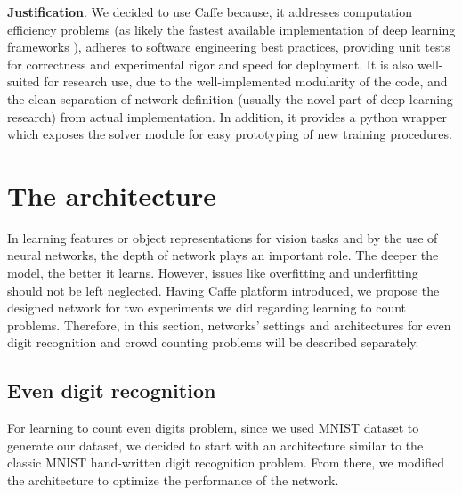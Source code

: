 \textbf{Justification}. We decided to use Caffe because, it addresses computation efficiency problems (as likely the fastest available implementation of deep learning frameworks ), adheres to software engineering best practices, providing unit tests for correctness and experimental rigor and speed for deployment. It is also well-suited for research use, due to the well-implemented modularity of the code, and the clean separation of network definition (usually the novel part of deep learning research) from actual implementation\cite{jia2014caffe}. In addition, it provides a python wrapper which exposes the solver module for easy prototyping of new training procedures. 

\section{The architecture}

In learning features or object representations for vision tasks and by the use of neural networks, the depth of network plays an important role. The deeper the model, the better it learns. However, issues like overfitting and underfitting should not be left neglected.   
Having Caffe platform introduced, we propose the designed network for two experiments we did regarding learning to count problems. Therefore, in this section, networks' settings and architectures for even digit recognition and crowd counting problems will be described separately. 

\subsection{Even digit recognition}
\label{subsubsec:digitarch}
For learning to count even digits problem, since we used MNIST dataset to generate our dataset, we decided to start with an architecture similar to the classic MNIST hand-written digit recognition problem\cite{lecun1995comparison}. From there, we modified the architecture to optimize the performance of the network.


